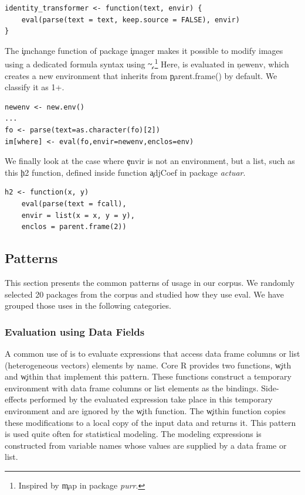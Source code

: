 \documentclass[conference]{IEEEtran}
\begin{document}
\begin{lstlisting}
identity_transformer <- function(text, envir) {
    eval(parse(text = text, keep.source = FALSE), envir)
}
\end{lstlisting}


The \c{imchange} function of package \c{imager} makes it possible to modify images using a dedicated formula syntax using \c{\~}.\footnote{Inspired by \c{map} in package \emph{purr}.}  Here, \eval is evaluated in \c{newenv}, which creates a new environment that inherits from \c{parent.frame()} by default. We classify it as 1+.


\begin{lstlisting}
newenv <- new.env()
...
fo <- parse(text=as.character(fo)[2])
im[where] <- eval(fo,envir=newenv,enclos=env)
\end{lstlisting}

We finally look at the case where \c{envir} is not an environment, but a list, such as this \c{h2} function, defined inside function \c{adjCoef} in package \emph{actuar}.

\begin{lstlisting}
h2 <- function(x, y)
    eval(parse(text = fcall),
    envir = list(x = x, y = y),
    enclos = parent.frame(2))
\end{lstlisting}

\subsection{Patterns}

This section presents the common patterns of \eval usage in our corpus. We
randomly selected 20 packages from the corpus and studied how they use eval.
We have grouped those uses in the following categories.

  \subsubsection{Evaluation using Data Fields} A common use of \eval is to
  evaluate expressions that access data frame columns or list (heterogeneous
  vectors) elements by name. Core R provides two functions, \c{with} and
  \c{within} that implement this pattern. These functions construct a temporary
  environment with data frame columns or list elements as the bindings.
  Side-effects performed by the evaluated expression take place in this temporary
  environment and are ignored by the \c{with} function. The \c{within} function
  copies these modifications to a local copy of the input data and returns it.
  This pattern is used quite often for statistical modeling. The modeling
  expressions is constructed from variable names whose values are supplied by a
  data frame or list.
\end{document}
